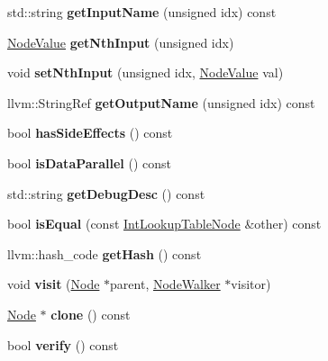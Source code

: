 \begin{DoxyCompactItemize}
std\+::string {\bfseries get\+Input\+Name} (unsigned idx) const
\item 
\mbox{\label{classglow_1_1_int_lookup_table_node_a9551079dc97c0b2c7ee991482c835fc6}} 
\hyperlink{structglow_1_1_node_value}{Node\+Value} {\bfseries get\+Nth\+Input} (unsigned idx)
\item 
\mbox{\label{classglow_1_1_int_lookup_table_node_afef60a9c96ee3973e78151426e7e5baf}} 
void {\bfseries set\+Nth\+Input} (unsigned idx, \hyperlink{structglow_1_1_node_value}{Node\+Value} val)
\item 
\mbox{\label{classglow_1_1_int_lookup_table_node_ab708755351b24dfb44c85d439147e798}} 
llvm\+::\+String\+Ref {\bfseries get\+Output\+Name} (unsigned idx) const
\item 
\mbox{\label{classglow_1_1_int_lookup_table_node_a3cdd55e1eb7be038a64e25d6668142df}} 
bool {\bfseries has\+Side\+Effects} () const
\item 
\mbox{\label{classglow_1_1_int_lookup_table_node_a66a37901d6eab71f765b79ee8235ee3c}} 
bool {\bfseries is\+Data\+Parallel} () const
\item 
\mbox{\label{classglow_1_1_int_lookup_table_node_aae52c440738b30385aecae588cb79075}} 
std\+::string {\bfseries get\+Debug\+Desc} () const
\item 
\mbox{\label{classglow_1_1_int_lookup_table_node_af0f6a67aa955411126693849bc153f64}} 
bool {\bfseries is\+Equal} (const \hyperlink{classglow_1_1_int_lookup_table_node}{Int\+Lookup\+Table\+Node} \&other) const
\item 
\mbox{\label{classglow_1_1_int_lookup_table_node_a222052f102776166a387e610ac605d39}} 
llvm\+::hash\+\_\+code {\bfseries get\+Hash} () const
\item 
\mbox{\label{classglow_1_1_int_lookup_table_node_a6ffe2fb07072e09fd1037bba99d3b75b}} 
void {\bfseries visit} (\hyperlink{classglow_1_1_node}{Node} $\ast$parent, \hyperlink{classglow_1_1_node_walker}{Node\+Walker} $\ast$visitor)
\item 
\mbox{\label{classglow_1_1_int_lookup_table_node_a269d0c888182e73955894620fe9d26c0}} 
\hyperlink{classglow_1_1_node}{Node} $\ast$ {\bfseries clone} () const
\item 
\mbox{\label{classglow_1_1_int_lookup_table_node_a6f8574e0d8f506f42b5ea3bbebfb5442}} 
bool {\bfseries verify} () const
\end{DoxyCompactItemize}
